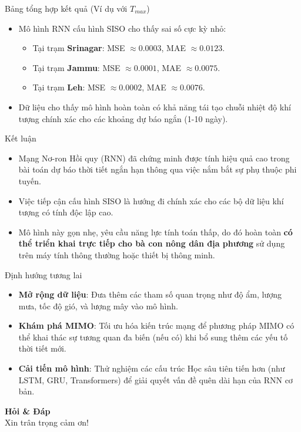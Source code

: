 \documentclass[aspectratio=169]{beamer}
\begin{document}
\begin{frame}{Bảng tổng hợp kết quả (Ví dụ với $T_{max}$)}
    \begin{itemize}
        \item Mô hình RNN cấu hình SISO cho thấy sai số cực kỳ nhỏ:
        \begin{itemize}
            \item Tại trạm \textbf{Srinagar}: MSE $\approx 0.0003$, MAE $\approx 0.0123$.
            \item Tại trạm \textbf{Jammu}: MSE $\approx 0.0001$, MAE $\approx 0.0075$.
            \item Tại trạm \textbf{Leh}: MSE $\approx 0.0002$, MAE $\approx 0.0076$.
        \end{itemize}
        \item Dữ liệu cho thấy mô hình hoàn toàn có khả năng tái tạo chuỗi nhiệt độ khí tượng chính xác cho các khoảng dự báo ngắn (1-10 ngày).
    \end{itemize}
\end{frame}

\begin{frame}{Kết luận}
    \begin{itemize}
        \item Mạng Nơ-ron Hồi quy (RNN) đã chứng minh được tính hiệu quả cao trong bài toán dự báo thời tiết ngắn hạn thông qua việc nắm bắt sự phụ thuộc phi tuyến.
        \item Việc tiếp cận cấu hình SISO là hướng đi chính xác cho các bộ dữ liệu khí tượng có tính độc lập cao.
        \item Mô hình này gọn nhẹ, yêu cầu năng lực tính toán thấp, do đó hoàn toàn \textbf{có thể triển khai trực tiếp cho bà con nông dân địa phương} sử dụng trên máy tính thông thường hoặc thiết bị thông minh.
    \end{itemize}
\end{frame}

\begin{frame}{Định hướng tương lai}
    \begin{itemize}
        \item \textbf{Mở rộng dữ liệu}: Đưa thêm các tham số quan trọng như độ ẩm, lượng mưa, tốc độ gió, và lượng mây vào mô hình.
        \item \textbf{Khám phá MIMO}: Tối ưu hóa kiến trúc mạng để phương pháp MIMO có thể khai thác sự tương quan đa biến (nếu có) khi bổ sung thêm các yếu tố thời tiết mới.
        \item \textbf{Cải tiến mô hình}: Thử nghiệm các cấu trúc Học sâu tiên tiến hơn (như LSTM, GRU, Transformers) để giải quyết vấn đề quên dài hạn của RNN cơ bản.
    \end{itemize}
\end{frame}

\begin{frame}
    \centering
    \Huge \textbf{Hỏi \& Đáp} \\
    \vspace{1cm}
    \large Xin trân trọng cảm ơn!
\end{frame}
\end{document}
